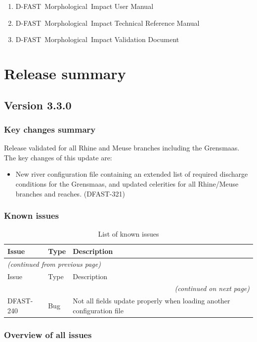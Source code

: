 \documentclass[git]{deltares_manual}
\newcommand{\dfastmi}{\textrm{D-FAST~Morphological~Impact}\xspace}
\newcommand{\dfmiversion}{3.3.0}
\begin{document}
\begin{enumerate}
\item \dfastmi User Manual
\item \dfastmi Technical Reference Manual
\item \dfastmi Validation Document
\end{enumerate}

\chapter{Release summary}

\section{Version \dfmiversion}

\subsection{Key changes summary}
Release validated for all Rhine and Meuse branches including the Grensmaas.
The key changes of this update are:

\begin{itemize}
\item New river configuration file containing an extended list of required discharge conditions for the Grensmaas, and updated celerities for all Rhine/Meuse branches and reaches. (DFAST-321)
\end{itemize}

\subsection{Known issues}

\begin{longtable}{l|l|p{8cm}}
\caption{List of known issues} \\
Issue & Type & Description \\ \hline
\endfirsthead
\multicolumn{3}{l}{\textsl{(continued from previous page)}} \\
Issue & Type & Description \\ \hline
\endhead
\hline \multicolumn{3}{r}{\textsl{(continued on next page)}} \\
\endfoot
\endlastfoot 
DFAST-240 & Bug & Not all fields update properly when loading another configuration file \\
\end{longtable}

\subsection{Overview of all issues}
\end{document}

